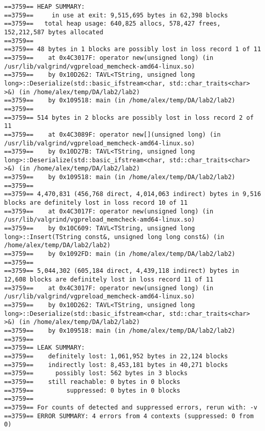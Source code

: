 \documentclass[12pt]{article}
\begin{document}
\begin{small}
\footnotesize
\begin{verbatim}
==3759== HEAP SUMMARY:
==3759==     in use at exit: 9,515,695 bytes in 62,398 blocks
==3759==   total heap usage: 640,825 allocs, 578,427 frees, 152,212,587 bytes allocated
==3759== 
==3759== 48 bytes in 1 blocks are possibly lost in loss record 1 of 11
==3759==    at 0x4C3017F: operator new(unsigned long) (in /usr/lib/valgrind/vgpreload_memcheck-amd64-linux.so)
==3759==    by 0x10D262: TAVL<TString, unsigned long long>::Deserialize(std::basic_ifstream<char, std::char_traits<char> >&) (in /home/alex/temp/DA/lab2/lab2)
==3759==    by 0x109518: main (in /home/alex/temp/DA/lab2/lab2)
==3759== 
==3759== 514 bytes in 2 blocks are possibly lost in loss record 2 of 11
==3759==    at 0x4C3089F: operator new[](unsigned long) (in /usr/lib/valgrind/vgpreload_memcheck-amd64-linux.so)
==3759==    by 0x10D27B: TAVL<TString, unsigned long long>::Deserialize(std::basic_ifstream<char, std::char_traits<char> >&) (in /home/alex/temp/DA/lab2/lab2)
==3759==    by 0x109518: main (in /home/alex/temp/DA/lab2/lab2)
==3759== 
==3759== 4,470,831 (456,768 direct, 4,014,063 indirect) bytes in 9,516 blocks are definitely lost in loss record 10 of 11
==3759==    at 0x4C3017F: operator new(unsigned long) (in /usr/lib/valgrind/vgpreload_memcheck-amd64-linux.so)
==3759==    by 0x10C609: TAVL<TString, unsigned long long>::Insert(TString const&, unsigned long long const&) (in /home/alex/temp/DA/lab2/lab2)
==3759==    by 0x1092FD: main (in /home/alex/temp/DA/lab2/lab2)
==3759== 
==3759== 5,044,302 (605,184 direct, 4,439,118 indirect) bytes in 12,608 blocks are definitely lost in loss record 11 of 11
==3759==    at 0x4C3017F: operator new(unsigned long) (in /usr/lib/valgrind/vgpreload_memcheck-amd64-linux.so)
==3759==    by 0x10D262: TAVL<TString, unsigned long long>::Deserialize(std::basic_ifstream<char, std::char_traits<char> >&) (in /home/alex/temp/DA/lab2/lab2)
==3759==    by 0x109518: main (in /home/alex/temp/DA/lab2/lab2)
==3759== 
==3759== LEAK SUMMARY:
==3759==    definitely lost: 1,061,952 bytes in 22,124 blocks
==3759==    indirectly lost: 8,453,181 bytes in 40,271 blocks
==3759==      possibly lost: 562 bytes in 3 blocks
==3759==    still reachable: 0 bytes in 0 blocks
==3759==         suppressed: 0 bytes in 0 blocks
==3759== 
==3759== For counts of detected and suppressed errors, rerun with: -v
==3759== ERROR SUMMARY: 4 errors from 4 contexts (suppressed: 0 from 0)
\end{verbatim}
\end{small}
\end{document}
